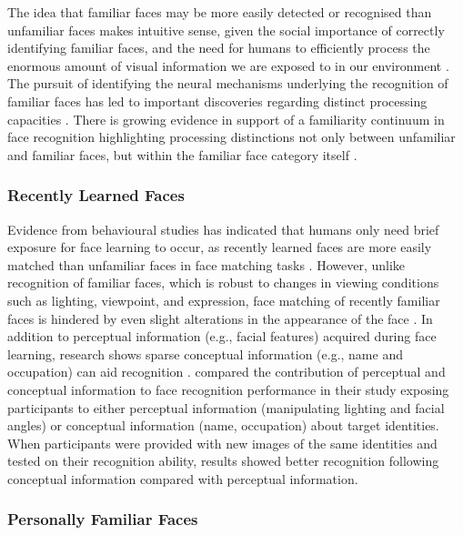 \documentclass[
  10pt,
  letterpaper,
]{article}
\begin{document}
The idea that familiar faces may be more easily detected or recognised
than unfamiliar faces makes intuitive sense, given the social importance
of correctly identifying familiar faces, and the need for humans to
efficiently process the enormous amount of visual information we are
exposed to in our environment \citep{tong1999a}. The pursuit of
identifying the neural mechanisms underlying the recognition of familiar
faces has led to important discoveries regarding distinct processing
capacities \citep{bortolon2017a, ramon2017a}. There is growing evidence
in support of a familiarity continuum in face recognition highlighting
processing distinctions not only between unfamiliar and familiar faces,
but within the familiar face category itself
\citep{megraya2006a, murphy2015a, quek2021a, wiese2021a}.

\subsubsection{Recently Learned Faces}\label{recently-learned-faces}

Evidence from behavioural studies has indicated that humans only need
brief exposure for face learning to occur, as recently learned faces are
more easily matched than unfamiliar faces in face matching tasks
\citep{dowsett2016a, kramer2017a, murphy2015a, quek2021a}. However,
unlike recognition of familiar faces, which is robust to changes in
viewing conditions such as lighting, viewpoint, and expression, face
matching of recently familiar faces is hindered by even slight
alterations in the appearance of the face
\citep{burton2011a, redfern2019a, megraya2008a, white2016a}. In addition
to perceptual information (e.g., facial features) acquired during face
learning, research shows sparse conceptual information (e.g., name and
occupation) can aid recognition \citep{oruc2019a, schwartz2019a}.
\citet{schwartz2016a} compared the contribution of perceptual and
conceptual information to face recognition performance in their study
exposing participants to either perceptual information (manipulating
lighting and facial angles) or conceptual information (name, occupation)
about target identities. When participants were provided with new images
of the same identities and tested on their recognition ability, results
showed better recognition following conceptual information compared with
perceptual information.

\subsubsection{Personally Familiar
Faces}\label{personally-familiar-faces}
\end{document}
